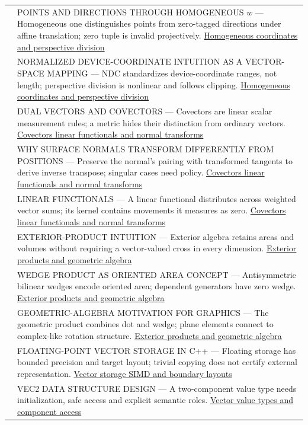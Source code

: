 {\begin{longtable}[]{@{}
  >{\raggedright\arraybackslash}p{}
  >{\raggedright\arraybackslash}p{}@{}}
579 & POINTS AND DIRECTIONS THROUGH HOMOGENEOUS \(w\) --- Homogeneous one distinguishes points from zero-tagged directions under affine translation; zero tuple is invalid projectively. \hyperref[appendix-cb3b26862282]{Homogeneous coordinates and perspective division} \\
580 & NORMALIZED DEVICE-COORDINATE INTUITION AS A VECTOR-SPACE MAPPING --- NDC standardizes device-coordinate ranges, not length; perspective division is nonlinear and follows clipping. \hyperref[appendix-cb3b26862282]{Homogeneous coordinates and perspective division} \\
581 & DUAL VECTORS AND COVECTORS --- Covectors are linear scalar measurement rules; a metric hides their distinction from ordinary vectors. \hyperref[appendix-46da295c6787]{Covectors linear functionals and normal transforms} \\
582 & WHY SURFACE NORMALS TRANSFORM DIFFERENTLY FROM POSITIONS --- Preserve the normal's pairing with transformed tangents to derive inverse transpose; singular cases need policy. \hyperref[appendix-46da295c6787]{Covectors linear functionals and normal transforms} \\
583 & LINEAR FUNCTIONALS --- A linear functional distributes across weighted vector sums; its kernel contains movements it measures as zero. \hyperref[appendix-46da295c6787]{Covectors linear functionals and normal transforms} \\
584 & EXTERIOR-PRODUCT INTUITION --- Exterior algebra retains areas and volumes without requiring a vector-valued cross in every dimension. \hyperref[appendix-e1960925d1b8]{Exterior products and geometric algebra} \\
585 & WEDGE PRODUCT AS ORIENTED AREA CONCEPT --- Antisymmetric bilinear wedges encode oriented area; dependent generators have zero wedge. \hyperref[appendix-e1960925d1b8]{Exterior products and geometric algebra} \\
586 & GEOMETRIC-ALGEBRA MOTIVATION FOR GRAPHICS --- The geometric product combines dot and wedge; plane elements connect to complex-like rotation structure. \hyperref[appendix-e1960925d1b8]{Exterior products and geometric algebra} \\
587 & FLOATING-POINT VECTOR STORAGE IN C++ --- Floating storage has bounded precision and target layout; trivial copying does not certify external representation. \hyperref[appendix-26bf6bf2fb8b]{Vector storage SIMD and boundary layouts} \\
588 & VEC2 DATA STRUCTURE DESIGN --- A two-component value type needs initialization, safe access and explicit semantic roles. \hyperref[appendix-37a39984ba66]{Vector value types and component access} \\

\end{longtable}}
